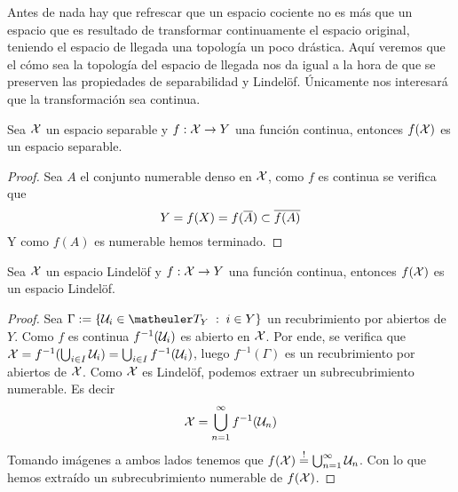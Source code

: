 Antes de nada hay que refrescar que un espacio cociente no es más que un espacio que es resultado de transformar continuamente el espacio original, teniendo el espacio de llegada una topología un poco drástica. Aquí veremos que el cómo sea la topología del espacio de llegada nos da igual a la hora de que se preserven las propiedades de separabilidad y Lindelöf. Únicamente nos interesará que la transformación sea continua.
\begin{prop}
	Sea $\mathcal{X}$ un espacio separable y $f:\mathcal{X}\to Y$ una función continua, entonces $f(\mathcal{X})$ es un espacio separable.
\end{prop}
\begin{proof}
	Sea $A$ el conjunto numerable denso en $\mathcal{X}$, como $f$ es continua se verifica que
	\begin{equation*}
		Y=f(X)=f(\overline{A})\subset\overline{f(A)}
	\end{equation*}
	Y como $f(A)$ es numerable hemos terminado.
\end{proof}
\begin{prop}
	Sea $\mathcal{X}$ un espacio Lindelöf y $f:\mathcal{X}\to Y$ una función continua, entonces $f(\mathcal{X})$ es un espacio Lindelöf.
\end{prop}
\begin{proof}
	Sea $\Gamma:=\{\U_i\in\T_Y\midc i\in Y\}$ un recubrimiento por abiertos de $Y$. Como $f$ es continua $f^{-1}(\mathcal{U}_i)$ es abierto en $\mathcal{X}$. Por ende, se verifica que $\mathcal{X} = f^{-1}(\bigcup_{i\in I}\mathcal{U}_i)=\bigcup_{i\in I} f^{-1}(\mathcal{U}_i)$, luego $f^{-1}(\Gamma)$ es un recubrimiento por abiertos de $\mathcal{X}$. Como $\mathcal{X}$ es Lindelöf, podemos extraer un subrecubrimiento numerable. Es decir
	\begin{equation*}
		\mathcal{X}=\bigcup_{n=1}^{\infty}f^{-1}(\mathcal{U}_n)
	\end{equation*}
	Tomando imágenes a ambos lados tenemos que $f(\mathcal{X})\stackrel{!}{=}\bigcup_{n=1}^{\infty}\mathcal{U}_n$. Con lo que hemos extraído un subrecubrimiento numerable de $f(\mathcal{X})$.
\end{proof}
